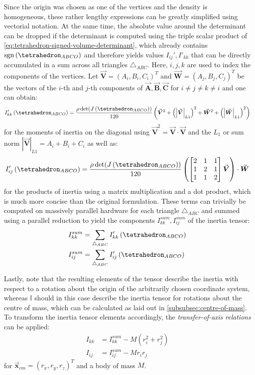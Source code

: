 \documentclass[oneside, a4paper]{book}
\newcommand\abs[1]{\left|#1\right|}
\newcommand\vek[1]{\vec{\bm{#1}}}
\newcommand\br[1]{\left(#1\right)}
\DeclareMathOperator{\sgn}{sgn}
\begin{document}
\begin{appendices}
  Since the origin was chosen as one of the vertices and the density is homogeneous, these rather lengthy expressions can be greatly simplified using vectorial notation. At the same time, the absolute value around the determinant can be dropped if the determinant is computed using the triple scalar product of \autoref{eq:tetrahedron-signed-volume-determinant}, which already contains $\sgn\br{\tetrahedron_{ABCO}}$ and therefore yields values $I_{ij}', I'_{kk}$ that can be directly accumulated in a sum across all triangles $\triangle_{ABC}$.  Here, $i,j,k$ are used to index the components of the vertices. Let $\vek{V}=\br{A_i, B_i, C_i}^T$ and $\vek{W}=\br{A_j, B_j, C_j}^T$ be the vectors of the $i$-th and $j$-th components of $\vek{A}, \vek{B}, \vek{C}$ for $i\neq j \neq k \neq i$ and one can obtain:
  \begin{equation}
    I_{kk}'\br{\tetrahedron_{ABCO}} = \frac{\rho \det(J\br{\tetrahedron_{ABCO}})}{120}\br{
      \vek{V}^2 + \br{\abs{\vek{V}}_{L1}}^2 +\vek{W}^2 +  \br{\abs{\vek{W}}_{L1}}^2
    }
  \end{equation}
  for the moments of inertia on the diagonal using $\vek{V}^2=\vek{V}\cdot\vek{V}$ and the $L_1$ or sum norm $\abs{\vek{V}}_{L1} = A_i+B_i+C_i$ as well as: \begin{equation}
    I_{ij}'\br{\tetrahedron_{ABCO}}  = \frac{\rho \det(J\br{\tetrahedron_{ABCO}})}{120}\br{ \begin{bmatrix}
      2&1&1\\
      1&2&1\\
      1&1&2
    \end{bmatrix} \vek{V}} \cdot \vek{W}
  \end{equation}
  for the products of inertia using a matrix multiplication and a dot product, which is much more concise than the original formulation. These terms can trivially be computed on massively parallel hardware for each triangle $\triangle_{ABC}$ and summed using a parallel reduction to yield the components $I_{kk}^{sum}, I_{ij}^{sum}$ of the inertia tensor:
  \begin{align}
    I_{kk}^{sum} &= \sum_{\triangle_{ABC}} I_{kk}' \br{\tetrahedron_{ABCO}}\\
    I_{ij}^{sum} &= \sum_{\triangle_{ABC}} I_{ij}' \br{\tetrahedron_{ABCO}}
  \end{align}

  Lastly, note that the resulting elements of the tensor describe the inertia with respect to a rotation about the origin of the arbitrarily chosen coordinate system, whereas $\mathds{I}$ should in this case describe the inertia tensor for rotations about the centre of mass, which can be calculated as laid out in \autoref{subsubsec:centre-of-mass}. To transform the inertia tensor elements accordingly, the \textit{transfer-of-axis relations} can be applied: \autocite{fast-accurate-polyhedral-mass-properties}\begin{align}\label{eq:inertia-appendix-final-eq}
    I_{kk} &= I_{kk}^{sum} - M\br{r_i^2+r_j^2}\\
    I_{ij} &= I_{ij}^{sum} - Mr_ir_j
  \end{align}
  for $\vek{x}_{cm}=(r_x,r_y,r_z)^T$ and a body of mass $M$. 



\end{appendices}

\printbibliography[
  heading=bibintoc,
  title={Bibliography}
]
\end{document}
